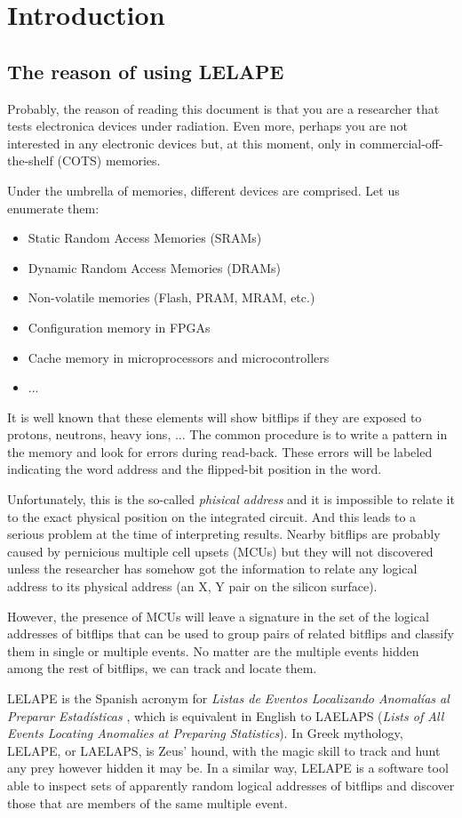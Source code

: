 \chapter{Introduction}
%
\section{The reason of using LELAPE}
Probably, the reason of reading this document is that you are a researcher that tests electronica devices under radiation. Even more, perhaps you are not interested in any electronic devices but, at this moment, only in commercial-off-the-shelf (COTS) memories. 

Under the umbrella of memories, different devices are comprised. Let us enumerate them:
%
\begin{itemize}
	\item Static Random Access Memories (SRAMs)
	\item Dynamic Random Access Memories (DRAMs)
	\item Non-volatile memories (Flash, PRAM, MRAM, etc.)
	\item Configuration memory in FPGAs
	\item Cache memory in microprocessors and microcontrollers
	\item ...
\end{itemize}
%
It is well known that these elements will show bitflips if they are exposed to protons, neutrons, heavy ions, ... The common procedure is to write a pattern in the memory and look for errors during read-back. These errors will be labeled indicating the word address and the flipped-bit position in the word. 

Unfortunately, this is the so-called \textit{phisical address} and it is impossible to relate it to the exact physical position on the integrated circuit. And this leads to a serious problem at the time of interpreting results. Nearby bitflips are probably caused by pernicious multiple cell upsets (MCUs) but they will not discovered unless the researcher has somehow got the information to relate any logical address to its physical address (an X, Y pair on the silicon surface).

However, the presence of MCUs will leave a signature in the set of the logical addresses of bitflips that can be used to group pairs of related bitflips and classify them in single or multiple events. No matter are the multiple events hidden among the rest of bitflips, we can track and locate them.

LELAPE is the Spanish acronym for \textit{Listas de Eventos Localizando Anomalías al Preparar Estadísticas }, which is equivalent in English to LAELAPS (\textit{Lists of All Events Locating Anomalies at Preparing Statistics}). In Greek mythology, LELAPE, or LAELAPS, is Zeus' hound, with the magic skill to track and hunt any prey however hidden it may be. In a similar way, LELAPE is a software tool able to inspect sets of apparently random logical addresses of bitflips and discover those that are members of the same multiple event.
%
